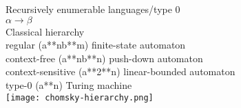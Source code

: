 \scriptsize{Recursively enumerable languages/type 0}\\{\tiny $\alpha \to \beta$
}\\
\scriptsize{Classical hierarchy}\\ {\tiny regular (a**nb**m) finite-state automaton \\
context-free (a**nb**n) push-down automaton\\
context-sensitive (a**2**n) linear-bounded automaton\\
type-0 (a**n) Turing machine
}\\
\texttt{[image: chomsky-hierarchy.png]}
